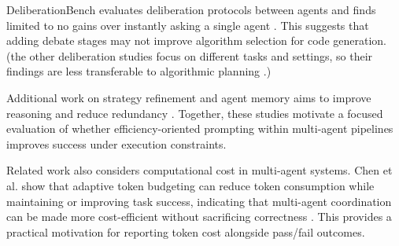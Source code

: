 \documentclass{article}
\begin{document}
DeliberationBench evaluates deliberation protocols between agents and finds limited to no gains over instantly asking a single agent \cite{kaushal2025}. This suggests that adding debate stages may not improve algorithm selection for code generation. (the other deliberation studies focus on different tasks and settings, so their findings are less transferable to algorithmic planning \cite{yang2025,sachdeva2025,rosenberg2025}.)

Additional work on strategy refinement and agent memory aims to improve reasoning and reduce redundancy \cite{stein2025,fioresi2026}. Together, these studies motivate a focused evaluation of whether efficiency-oriented prompting within multi-agent pipelines improves success under execution constraints.

Related work also considers computational cost in multi-agent systems. Chen et al. show that adaptive token budgeting can reduce token consumption while maintaining or improving task success, indicating that multi-agent coordination can be made more cost-efficient without sacrificing correctness \cite{chen2026}. This provides a practical motivation for reporting token cost alongside pass/fail outcomes.

\nocite{*}


\end{document}
